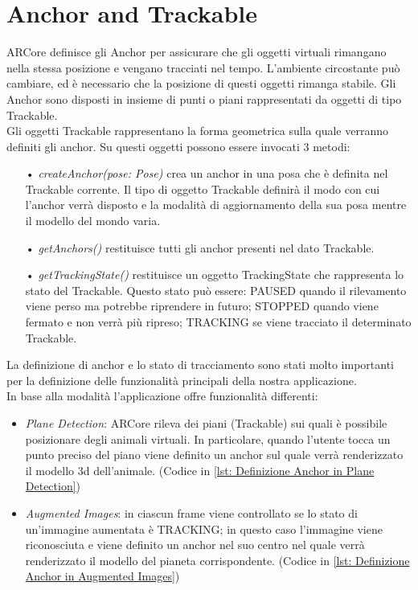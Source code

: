 \documentclass[crop=false, class=book]{standalone}
\begin{document}
		
	\chapter{Anchor and Trackable}
	
		ARCore definisce gli Anchor per assicurare che gli oggetti virtuali rimangano nella stessa posizione e vengano 					tracciati nel tempo. L'ambiente circostante può cambiare, ed è necessario che la posizione di questi oggetti
		rimanga stabile. Gli Anchor sono disposti in insieme di punti o piani rappresentati da oggetti di tipo Trackable.\\
		Gli oggetti Trackable rappresentano la forma geometrica sulla quale verranno definiti gli anchor.
		Su questi oggetti possono essere invocati 3 metodi:
		\begin{itemize}
			\item[•] \emph{createAnchor(pose: Pose)} crea un anchor in una posa che è definita nel Trackable corrente. Il tipo di oggetto Trackable definirà il modo con cui l'anchor verrà disposto e la modalità di aggiornamento della sua posa mentre il modello del mondo varia.
			\item[•] \emph{ getAnchors()} restituisce tutti gli anchor presenti nel dato Trackable.
			\item[•] \emph{getTrackingState()} restituisce un oggetto TrackingState che rappresenta lo stato del Trackable. Questo stato può essere: PAUSED quando il rilevamento viene perso ma potrebbe riprendere in futuro; STOPPED quando viene fermato e non verrà più ripreso; TRACKING se viene tracciato il determinato Trackable.
		\end{itemize}
		\begin{flushleft}
			La definizione di anchor e lo stato di tracciamento sono stati molto importanti per la definizione delle 						funzionalità principali della nostra applicazione.\\
	 		In base alla modalità l'applicazione offre funzionalità differenti:
		\end{flushleft}
	 	\begin{itemize}
	 		\item \emph{Plane Detection}: ARCore rileva dei piani (Trackable) sui quali è possibile posizionare degli animali virtuali. In particolare, quando l'utente tocca un punto preciso del piano viene definito un anchor sul quale verrà renderizzato il modello 3d dell'animale. (Codice in \vref{lst: Definizione Anchor in Plane Detection})
	 	
	 		\item \emph{Augmented Images}: in ciascun frame viene controllato se lo stato di un'immagine aumentata è TRACKING; in questo caso l'immagine viene riconosciuta e viene definito un anchor nel suo centro nel quale verrà renderizzato il modello del pianeta corrispondente. (Codice in \vref{lst: Definizione Anchor in Augmented Images})
	 	\end{itemize}
		
\end{document}
